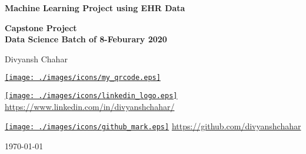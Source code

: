 \documentclass[12pt, twosided]{report}  %
\begin{document}
	\begin{titlepage}
		\begin{center}
			{\LARGE \textbf{Machine Learning Project using EHR Data}} \\
			
			\hrulefill
		
			\textbf{Capstone Project}
			\\
			\textbf{Data Science Batch of 8-Feburary 2020} 
			
			\null
			
			Divyansh Chahar
			
			\vfill
			
			\href{https://www.linkedin.com/in/divyanshchahar/}{\texttt{[image: ./images/icons/my\_qrcode.eps]}}
		
			\null
		
			\href{https://www.linkedin.com/in/divyanshchahar/}{\texttt{[image: ./images/icons/linkedin\_logo.eps]}}
			\href{https://www.linkedin.com/in/divyanshchahar/}{https://www.linkedin.com/in/divyanshchahar/}
			
			\null
			
			\href{https://www.linkedin.com/in/divyanshchahar/}{\texttt{[image: ./images/icons/github\_mark.eps]}}
			\href{https://github.com/divyanshchahar}{https://github.com/divyanshchahar}
			
			\vfill
			
			\today
			
		\end{center}
	\end{titlepage}


\restoregeometry

%
\end{document}
